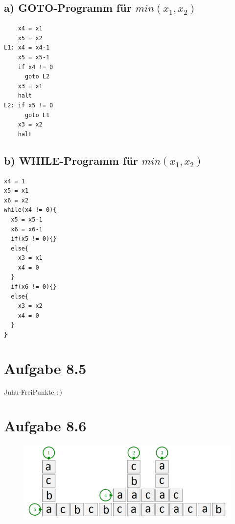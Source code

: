 \documentclass{article}
\begin{document}
\subsection*{a) GOTO-Programm für $min(x_1,x_2)$}
\begin{verbatim}
    x4 = x1
    x5 = x2
L1: x4 = x4-1
    x5 = x5-1
    if x4 != 0
      goto L2
    x3 = x1
    halt
L2: if x5 != 0
      goto L1
    x3 = x2
    halt
\end{verbatim}
\subsection*{b) WHILE-Programm für $min(x_1,x_2)$}
\begin{verbatim}
x4 = 1
x5 = x1
x6 = x2
while(x4 != 0){
  x5 = x5-1
  x6 = x6-1
  if(x5 != 0){}
  else{
    x3 = x1
    x4 = 0
  }
  if(x6 != 0){}
  else{
    x3 = x2
    x4 = 0
  }
}
\end{verbatim}
\section*{Aufgabe 8.5}
Juhu-FreiPunkte $:)$
\section*{Aufgabe 8.6}
\begin{figure}[!h]
  \includegraphics[scale=0.5]{crossword.png}
\end{figure}
\end{document}
